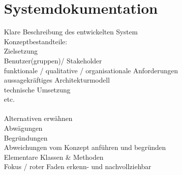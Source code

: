 
\chapter{Systemdokumentation}

Klare Beschreibung des entwickelten System\\
Konzeptbestandteile:\\
Zielsetzung\\
Benutzer(gruppen)/ Stakeholder\\
funktionale / qualitative / organisationale Anforderungen\\
aussagekräftiges Architekturmodell\\
technische Umsetzung\\
etc.\\
\\
Alternativen erwähnen\\
Abwägungen\\
Begründungen\\
Abweichungen vom Konzept anführen und begründen\\
Elementare Klassen \& Methoden\\
Fokus / roter Faden erkenn- und nachvollziehbar\\


\newpage



\newpage



\newpage



\newpage






